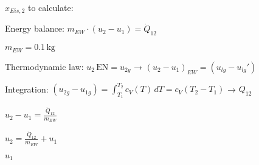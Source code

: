 \( x_{Eis,2} \) to calculate:  

Energy balance:  
\( m_{EW} \cdot (u_2 - u_1) = \dot{Q}_{12} \)  

\( m_{EW} = 0.1 \, \text{kg} \)  

Thermodynamic law: \( u_2 \, \text{EN} = u_{2g} \) → \( (u_2 - u_1)_{EW} = (u_{lg} - u_{lg}') \)  

Integration: \( (u_{2g} - u_{1g}) = \int_{T_1}^{T_2} c_V(T) \, dT = c_V(T_2 - T_1) \)  
→ \( Q_{12} \)  

\( u_2 - u_1 = \frac{\dot{Q}_{12}}{m_{EW}} \)  

\( u_2 = \frac{\dot{Q}_{12}}{m_{EW}} + u_1 \)  

\( u_1 \)